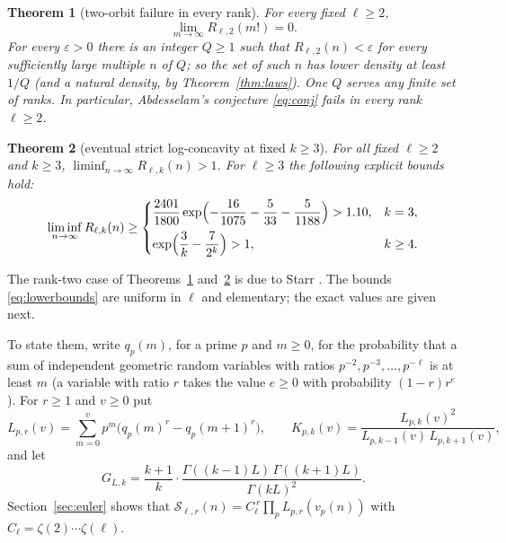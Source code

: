 \documentclass[11pt,a4paper]{article}
\newtheorem{theorem}{Theorem}[section]
\theoremstyle{remark}
\numberwithin{equation}{section}
\newcommand{\Sing}{\mathcal S}
\begin{document}
\begin{theorem}[two-orbit failure in every rank]\label{thm:fail}
For every fixed $\ell\ge2$,
\begin{equation}\label{eq:fail}
\lim_{m\to\infty}R_{\ell,2}(m!)=0 .
\end{equation}
For every $\varepsilon>0$ there is an integer $Q\ge1$ such that $R_{\ell,2}(n)<\varepsilon$ for every sufficiently large multiple $n$ of $Q$; so the set of such $n$ has lower density at least $1/Q$ (and a natural density, by Theorem~\ref{thm:laws}). One $Q$ serves any finite set of ranks. In particular, Abdesselam's conjecture \eqref{eq:conj} fails in every rank $\ell\ge2$.
\end{theorem}

\begin{theorem}[eventual strict log-concavity at fixed $k\ge3$]\label{thm:interior}
For all fixed $\ell\ge2$ and $k\ge3$, $\liminf_{n\to\infty}R_{\ell,k}(n)>1$. For $\ell\ge3$ the following explicit bounds hold:
\begin{equation}\label{eq:lowerbounds}
\liminf_{n\to\infty}R_{\ell,k}(n)\ge
\begin{cases}
\dfrac{2401}{1800}\exp\Bigl(-\dfrac{16}{1075}-\dfrac5{33}-\dfrac5{1188}\Bigr)>1.10, & k=3,\\[8pt]
\exp\Bigl(\dfrac3k-\dfrac7{2^k}\Bigr)>1, & k\ge4.
\end{cases}
\end{equation}
\end{theorem}

The rank-two case of Theorems~\ref{thm:fail} and~\ref{thm:interior} is due to Starr \cite{Starr2026a}. The bounds \eqref{eq:lowerbounds} are uniform in $\ell$ and elementary; the exact values are given next.

To state them, write $q_p(m)$, for a prime $p$ and $m\ge0$, for the probability that a sum of independent geometric random variables with ratios $p^{-2},p^{-3},\dots,p^{-\ell}$ is at least $m$ (a variable with ratio $r$ takes the value $e\ge0$ with probability $(1-r)r^e$). For $r\ge1$ and $v\ge0$ put
\begin{equation}\label{eq:Lpr}
L_{p,r}(v)=\sum_{m=0}^{v}p^m\bigl(q_p(m)^r-q_p(m+1)^r\bigr),\qquad
K_{p,k}(v)=\frac{L_{p,k}(v)^2}{L_{p,k-1}(v)\,L_{p,k+1}(v)},
\end{equation}
and let
\begin{equation}\label{eq:G}
G_{L,k}=\frac{k+1}{k}\cdot\frac{\Gamma((k-1)L)\,\Gamma((k+1)L)}{\Gamma(kL)^2}.
\end{equation}
Section~\ref{sec:euler} shows that $\Sing_{\ell,r}(n)=C_\ell^{\,r}\prod_pL_{p,r}(v_p(n))$ with $C_\ell=\zeta(2)\cdots\zeta(\ell)$.
\end{document}
